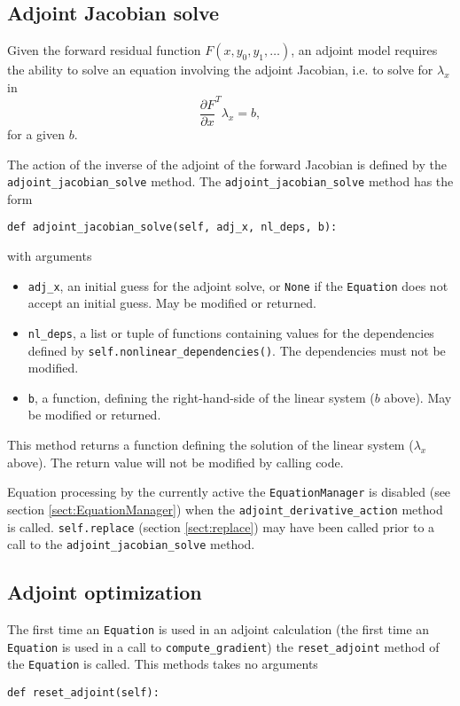 \documentclass[11pt]{article}
\begin{document}
\subsection{Adjoint Jacobian solve}

Given the forward residual function $F \left( x, y_0, y_1, \ldots \right)$, an
adjoint model requires the ability to solve an equation involving the adjoint
Jacobian, i.e. to solve for $\lambda_x$ in
\begin{equation*}
  \frac{\partial F}{\partial x}^T \lambda_x = b,
\end{equation*}
for a given $b$.

The action of the inverse of the adjoint of the forward Jacobian is defined by
the \texttt{adjoint\_jacobian\_solve} method. The
\texttt{adjoint\_jacobian\_solve} method has the form
\begin{lstlisting}
def adjoint_jacobian_solve(self, adj_x, nl_deps, b):
\end{lstlisting}
with arguments
\begin{itemize}
  \item \texttt{adj\_x}, an initial guess for the adjoint solve, or
    \texttt{None} if the \texttt{Equation} does not accept an initial guess.
    May be modified or returned.
  \item \texttt{nl\_deps}, a list or tuple of functions containing values for
    the dependencies defined by \texttt{self.nonlinear\_dependencies()}. The
    dependencies must not be modified.
  \item \texttt{b}, a function, defining the right-hand-side of the linear
    system ($b$ above). May be modified or returned.
\end{itemize}
This method returns a function defining the solution of the linear system
($\lambda_x$ above). The return value will not be modified by calling code.

Equation processing by the currently active the \texttt{EquationManager} is
disabled (see section \ref{sect:EquationManager}) when the
\texttt{adjoint\_derivative\_action} method is called. \texttt{self.replace}
(section \ref{sect:replace}) may have been called prior to a call to the
\texttt{adjoint\_jacobian\_solve} method.

\subsection{Adjoint optimization}

The first time an \texttt{Equation} is used in an adjoint calculation (the
first time an \texttt{Equation} is used in a call to
\texttt{compute\_gradient}) the \texttt{reset\_adjoint} method of the
\texttt{Equation} is called. This methods takes no arguments
\begin{lstlisting}
def reset_adjoint(self):
\end{lstlisting}
\end{document}
